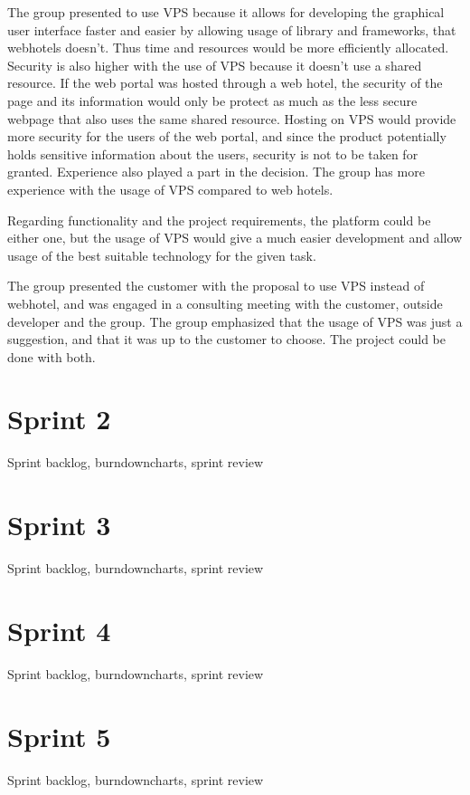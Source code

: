 The group presented to use VPS because it allows for developing the graphical user interface faster and easier by allowing usage of library and frameworks, that webhotels doesn't.  Thus time and resources would be more efficiently allocated. Security is also higher with the use of VPS because it doesn't use a shared resource. If the web portal was hosted through a web hotel, the security of the page and its information would only be protect as much as the less secure webpage that also uses the same shared resource. Hosting on VPS would provide more security for the users of the web portal, and since the product potentially holds sensitive information about the users, security is not to be taken for granted.  Experience also played a part in the decision. The group has more experience with the usage of VPS compared to web hotels. 

Regarding functionality and the project requirements, the platform could be either one, but the usage of VPS would give a much easier development and allow usage of the best suitable technology for the given task. 

The group presented the customer with the proposal to use VPS instead of webhotel, and was engaged in a consulting meeting with the customer, outside developer and the group. The group emphasized that the usage of VPS was just a suggestion, and that it was up to the customer to choose. The project could be done with both.  

\section{Sprint 2}
Sprint backlog, burndowncharts, sprint review

\section{Sprint 3}
Sprint backlog, burndowncharts, sprint review

\section{Sprint 4}
Sprint backlog, burndowncharts, sprint review

\section{Sprint 5}
Sprint backlog, burndowncharts, sprint review

\cleardoublepage